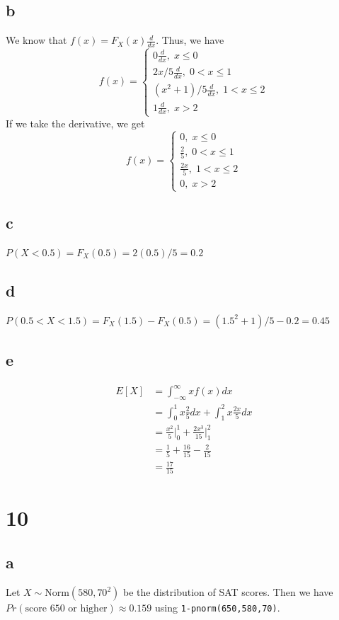 \documentclass[10pt]{article}
\begin{document}
\subsection*{b}
We know that $f(x)=F_X(x)\frac{d}{dx}$.
Thus, we have
\begin{equation*}
    f(x)=\begin{cases}
        0\frac{d}{dx}, \; x\le0\\
        2x/5\frac{d}{dx}, \; 0<x\le1\\
        (x^2+1)/5\frac{d}{dx}, \; 1<x\le 2\\
        1\frac{d}{dx}, \; x>2
    \end{cases}
\end{equation*}
If we take the derivative, we get
\begin{equation*}
    f(x)=\begin{cases}
        0, \; x\le0\\
        \frac{2}{5}, \; 0<x\le1\\
        \frac{2x}{5}, \; 1<x\le 2\\
        0, \; x>2
    \end{cases}
\end{equation*}
\subsection*{c}
$P(X<0.5)=F_X(0.5)=2(0.5)/5=0.2$
\subsection*{d}
$P(0.5<X<1.5) = F_X(1.5)-F_X(0.5) = (1.5^2+1)/5-0.2=0.45$
\subsection*{e}
\begin{align*}
    E[X] &= \int_{-\infty}^\infty xf(x)dx\\
    &= \int_0^1x\frac{2}{5}dx + \int_1^2x\frac{2x}{5}dx\\
    &= \frac{x^2}{5}\Bigr |_0^1 + \frac{2x^3}{15}\Bigr |_1^2\\
    &= \frac{1}{5} + \frac{16}{15} - \frac{2}{15}\\
    &= \frac{17}{15}
\end{align*}

\section*{10}
\subsection*{a}
Let $X\sim\text{Norm}(580, 70^2)$ be the distribution of SAT scores.
Then we have $Pr(\text{score $650$ or higher})\approx 0.159$ using \texttt{1-pnorm(650,580,70)}.
\end{document}

